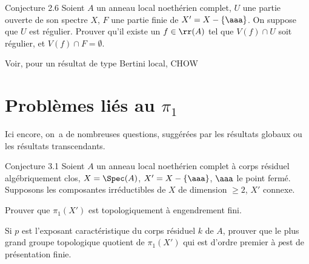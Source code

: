 \label{XIII.2.6}
\begin{enonce*}{Conjecture 2.6\ndemark}
Soient $A$ un anneau local noeth\'erien complet, $U$ une partie ouverte de son spectre $X$, $F$ une partie finie de $X'=X-\{ \aaa\}$. On suppose que $U$ est r\'egulier. Prouver qu'il existe un $f \in\rr(A)$ tel que $V(f)\cap U$ soit r\'egulier, et $V(f)\cap F=\emptyset$.
\end{enonce*}

Voir, pour un r\'esultat de type \og Bertini local\fg, CHOW~\cite{XIII.2}

\section{Probl\`emes li\'es au $\pi_1$} \label{XIII.3} Ici encore, on~a de nombreuses questions, sugg\'er\'ees par les r\'esultats globaux ou les r\'esultats transcendants.

\label{XIII.3.1}
\begin{enonce*}{Conjecture 3.1\ndemark} Soient $A$ un anneau local noeth\'erien complet \`a corps r\'esiduel alg\'ebriquement clos, $X=\Spec (A)$, $ X'= X- \{\aaa\}$, $\aaa$ le point ferm\'e. Supposons les composantes irr\'eductibles de $X$ de dimension $\ge 2$, $X'$ connexe.
\begin{enumeratei}
\item
Prouver que $\pi_1(X')$ est topologiquement \`a engendrement fini.
\item
Si $p$ est l'exposant caract\'eristique du corps r\'esiduel $k$ de $A$, prouver que le plus grand groupe topologique quotient de $\pi_1(X')$ qui est \og d'ordre premier \`a $p$\fg est de pr\'esentation finie.
\end{enumeratei}
\end{enonce*}

